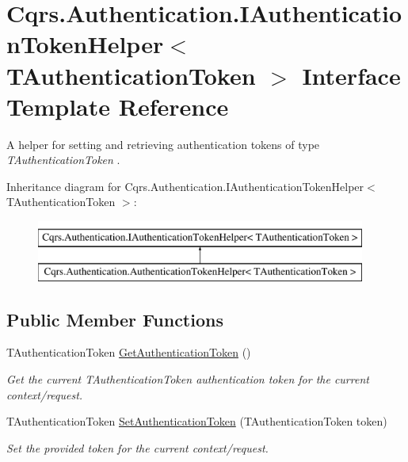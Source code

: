 \hypertarget{interfaceCqrs_1_1Authentication_1_1IAuthenticationTokenHelper}{}\section{Cqrs.\+Authentication.\+I\+Authentication\+Token\+Helper$<$ T\+Authentication\+Token $>$ Interface Template Reference}
\label{interfaceCqrs_1_1Authentication_1_1IAuthenticationTokenHelper}


A helper for setting and retrieving authentication tokens of type {\itshape T\+Authentication\+Token} .  


Inheritance diagram for Cqrs.\+Authentication.\+I\+Authentication\+Token\+Helper$<$ T\+Authentication\+Token $>$\+:\begin{figure}[H]
\begin{center}
\leavevmode
\includegraphics[height=2.000000cm]{interfaceCqrs_1_1Authentication_1_1IAuthenticationTokenHelper}
\end{center}
\end{figure}
\subsection*{Public Member Functions}
\begin{DoxyCompactItemize}
\item 
T\+Authentication\+Token \hyperlink{interfaceCqrs_1_1Authentication_1_1IAuthenticationTokenHelper_a4ccb928b5a6880921226508d36d4afc8_a4ccb928b5a6880921226508d36d4afc8}{Get\+Authentication\+Token} ()
\begin{DoxyCompactList}\small\item\em Get the current {\itshape T\+Authentication\+Token} authentication token for the current context/request. \end{DoxyCompactList}\item 
T\+Authentication\+Token \hyperlink{interfaceCqrs_1_1Authentication_1_1IAuthenticationTokenHelper_a1af9409257b2d8086be6dfae4edf37fb_a1af9409257b2d8086be6dfae4edf37fb}{Set\+Authentication\+Token} (T\+Authentication\+Token token)
\begin{DoxyCompactList}\small\item\em Set the provided {\itshape token}  for the current context/request. \end{DoxyCompactList}\end{DoxyCompactItemize}



